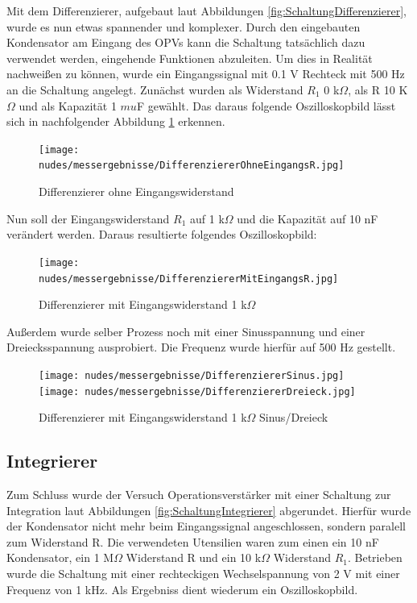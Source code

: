 \documentclass[12pt,a4paper,twoside]{article}
\begin{document}
Mit dem Differenzierer, aufgebaut laut Abbildungen \ref{fig:SchaltungDifferenzierer}, wurde es nun etwas spannender und komplexer. 
Durch den eingebauten Kondensator am Eingang des OPVs kann die Schaltung tatsächlich dazu verwendet werden, eingehende Funktionen abzuleiten. 
Um dies in Realität nachweißen zu können, wurde ein Eingangssignal mit 0.1 V Rechteck mit 500 Hz an die Schaltung angelegt. Zunächst wurden als Widerstand $R_{1}$ 0 k$\Omega$, als R 10 K$\Omega$ und als Kapazität 1 $mu$F gewählt.
Das daraus folgende Oszilloskopbild lässt sich in nachfolgender Abbildung \ref{fig:Differenzierer0R1} erkennen.

\begin{figure}[H]
    \centering
    \texttt{[image: nudes/messergebnisse/DifferenziererOhneEingangsR.jpg]}
    \caption{Differenzierer ohne Eingangswiderstand}
    \label{fig:Differenzierer0R1}
\end{figure}

\noindent
Nun soll der Eingangswiderstand $R_{1}$ auf 1 k$\Omega$ und die Kapazität auf 10 nF verändert werden. Daraus resultierte folgendes Oszilloskopbild:

\begin{figure}[H]
    \centering
    \texttt{[image: nudes/messergebnisse/DifferenziererMitEingangsR.jpg]}
    \caption{Differenzierer mit Eingangswiderstand 1 k$\Omega$}
    \label{fig:Differenzierer1R1}
\end{figure}

\noindent
Außerdem wurde selber Prozess noch mit einer Sinusspannung und einer Dreiecksspannung ausprobiert. Die Frequenz wurde hierfür auf 500 Hz gestellt.

\begin{figure}[H]
    \centering
    \texttt{[image: nudes/messergebnisse/DifferenziererSinus.jpg]}
    \texttt{[image: nudes/messergebnisse/DifferenziererDreieck.jpg]}
    \caption{Differenzierer mit Eingangswiderstand 1 k$\Omega$ Sinus/Dreieck}
    \label{fig:Differenzierer1R1Sinus/Dreieck}
\end{figure}


\subsection{Integrierer}
Zum Schluss wurde der Versuch Operationsverstärker mit einer Schaltung zur Integration laut Abbildungen \ref{fig:SchaltungIntegrierer} abgerundet. Hierfür wurde der Kondensator nicht mehr beim Eingangssignal angeschlossen, sondern paralell zum Widerstand R.
Die verwendeten Utensilien waren zum einen ein 10 nF Kondensator, ein 1 M$\Omega$ Widerstand R und ein 10 k$\Omega$ Widerstand $R_{1}$. Betrieben wurde die Schaltung mit einer rechteckigen Wechselspannung von 2 V mit einer Frequenz von 1 kHz. Als Ergebniss dient wiederum ein Oszilloskopbild.
\end{document}
